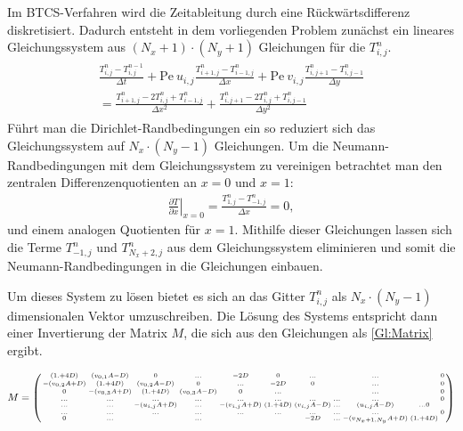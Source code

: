 Im BTCS-Verfahren wird die Zeitableitung durch eine Rückwärtsdifferenz diskretisiert. Dadurch entsteht in dem vorliegenden Problem zunächst ein lineares Gleichungssystem aus $(N_x+1)\cdot (N_y+1)$ Gleichungen für die $T^n_{i,j}$.
\begin{align}
  \begin{split}
  \frac{T^{n}_{i,j}-T^{n-1}_{i,j}}{\Delta t} + \text{Pe}~ u_{i,j} \frac{T^{n}_{i+1,j}-T^{n}_{i-1,j}}{\Delta x} + \text{Pe}~ v_{i,j} \frac{T^{n}_{i,j+1}-T^{n}_{i,j-1}}{\Delta y}\\
   =  \frac{T^{n}_{i+1,j}-2T^{n}_{i,j}+T^{n}_{i-1,j}}{\Delta x^2} +\frac{T^{n}_{i,j+1}-2T^{n}_{i,j}+T^{n}_{i,j-1}}{\Delta y^2}
 \end{split}\label{Gl:BTCS}
\end{align}
Führt man die Dirichlet-Randbedingungen ein so reduziert sich das Gleichungssystem auf $N_x \cdot (N_y-1)$ Gleichungen. Um die Neumann-Randbedingungen mit dem Gleichungssystem zu vereinigen betrachtet man den zentralen Differenzenquotienten an $x=0$ und $x=1$:
\begin{align}
  \left. \frac{\partial T}{\partial x}\right|_{x=0} = \frac{T^{n}_{1,j}-T^{n}_{-1,j}}{\Delta x} = 0, \nonumber
\end{align}
und einem analogen Quotienten für $x=1$. Mithilfe dieser Gleichungen lassen sich die Terme $T^{n}_{-1,j}$ und $T^{n}_{N_x+2,j}$ aus dem Gleichungssystem eliminieren und somit die Neumann-Randbedingungen in die Gleichungen einbauen.

Um dieses System zu lösen bietet es sich an das Gitter $T^n_{i,j}$ als $N_x \cdot (N_y-1)$ dimensionalen Vektor umzuschreiben.
Die Lösung des Systems entspricht dann einer Invertierung der Matrix $M$, die sich aus den Gleichungen als \cref{Gl:Matrix} ergibt.

\begin{align}
M=\left(\begin{medsize}\begin{smallmatrix}
(1.+4D)      & (v_{0,1}A-D) & 0          & ...       & -2D       & 0        &...       &&...       &&0    \\
-(v_{0,2}A+D) & (1.+4D)      & (v_{0,2}A-D) & 0         & ...      & -2D       &0       &&...       &&0    \\
0          &-(v_{0,3}A+D)  & (1.+4D)      &(v_{0,3}A-D) &0         &...       &       & &...       &&0 \\
...          & ...        &...         &...        &...       &...       &...       &...&...       &&0\\
...          &  ...       &-(u_{i,j}A+D)  &...        &-(v_{i,j}A+D)&(1.+4D)     &(v_{i,j}A-D)& ...      & (u_{i,j}A-D)&... 0\\
    ...         & ...        &...         &...        &...       &...       &...       &...&...       &&0\\
0          &...         &            &...        &           &         &-2D          &...       &-(v_{N_x+1,N_y}A+D) &(1.+4D)
\end{smallmatrix}\end{medsize}\right)\label{Gl:Matrix}
\end{align}



